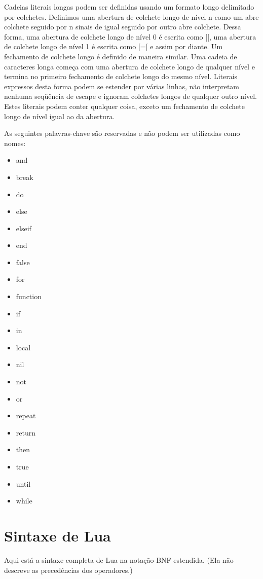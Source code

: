 \documentclass[
12pt, %
openright, %
oneside, %
a4paper, %
english, %
brazil, %
]{abntex2}
\begin{document}
Cadeias literais longas podem ser definidas usando um formato longo delimitado por colchetes. Definimos uma abertura de colchete longo de nível n como um abre colchete seguido por n sinais de igual seguido por outro abre colchete. Dessa forma, uma abertura de colchete longo de nível 0 é escrita como [[, uma abertura de colchete longo de nível 1 é escrita como [=[ e assim por diante. Um fechamento de colchete longo é definido de maneira similar. Uma cadeia de caracteres longa começa com uma abertura de colchete longo de qualquer nível e termina no primeiro fechamento de colchete longo do mesmo nível. Literais expressos desta forma podem se estender por várias linhas, não interpretam nenhuma seqüência de escape e ignoram colchetes longos de qualquer outro nível. Estes literais podem conter qualquer coisa, exceto um fechamento de colchete longo de nível igual ao da abertura.

As seguintes palavras-chave são reservadas e não podem ser utilizadas como nomes:
\begin{itemize}
\item and
\item break
\item do
\item else 
\item elseif
\item end
\item false
\item for
\item function
\item if
\item in
\item local
\item nil
\item not
\item or
\item repeat
\item return
\item then
\item true
\item until
\item while
\end{itemize}

\section{Sintaxe de Lua}
Aqui está a sintaxe completa de Lua na notação BNF estendida. (Ela não descreve as precedências dos operadores.)
\end{document}
